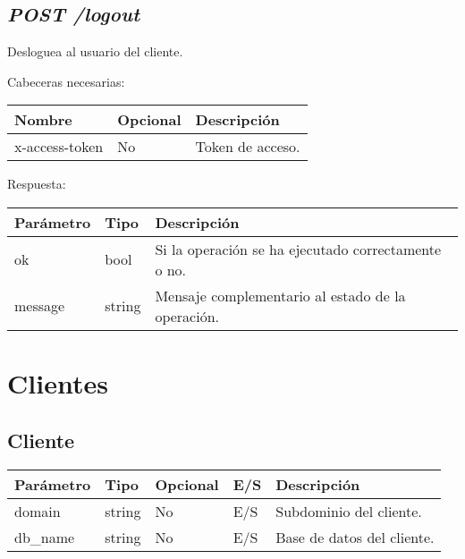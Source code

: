 \subsection{\textit{POST /logout}}

Desloguea al usuario del cliente.

\bigskip
Cabeceras necesarias:

\begin{table}[h!]
	\centering
\begin{adjustbox}{max width=\textwidth}
	\begin{tabular}{|l|l|l|}
		\hline
		Nombre & Opcional & Descripción \\ \hline
		x-access-token & No & Token de acceso. \\ \hline
	\end{tabular}
\end{adjustbox}
\end{table}


Respuesta:
\begin{table}[h!]
	\centering
	\begin{adjustbox}{max width=\textwidth}
	\begin{tabular}{|l|l|l|}
		\hline
		Parámetro & Tipo & Descripción \\ \hline
		ok & bool & Si la operación se ha ejecutado correctamente o no. \\ \hline
		message & string & Mensaje complementario al estado de la operación. \\ \hline
	\end{tabular}
\end{adjustbox}
\end{table}




\section{Clientes}

\subsection{Cliente}
\label{sec:cliente}
\begin{table}[h!]
	\centering
	\begin{adjustbox}{max width=\textwidth}
	\begin{tabular}{|l|l|l|l|l|}
		\hline
		Parámetro & Tipo & Opcional & E/S & Descripción \\ \hline
		domain & string & No & E/S & Subdominio del cliente. \\ \hline
		db\_name & string & No & E/S & Base de datos del cliente. \\ \hline
	\end{tabular}
\end{adjustbox}
\end{table}


